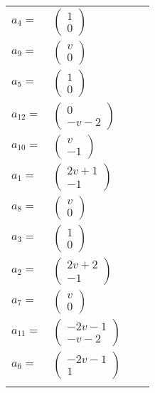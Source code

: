\documentclass[1p]{elsarticle_modified}
\theoremstyle{definition}
\begin{document}
\begin{tabular}{m{7pt} m{180pt} m{7pt} m{180pt} }
\flushright $a_{4}=$&$\begin{pmatrix}1\\0\end{pmatrix}$ \\
\flushright $a_{9}=$&$\begin{pmatrix}v\\0\end{pmatrix}$ \\
\flushright $a_{5}=$&$\begin{pmatrix}1\\0\end{pmatrix}$ \\
\flushright $a_{12}=$&$\begin{pmatrix}0\\- v-2\end{pmatrix}$ \\
\flushright $a_{10}=$&$\begin{pmatrix}v\\-1\end{pmatrix}$ \\
\flushright $a_{1}=$&$\begin{pmatrix}2 v+1\\-1\end{pmatrix}$ \\
\flushright $a_{8}=$&$\begin{pmatrix}v\\0\end{pmatrix}$ \\
\flushright $a_{3}=$&$\begin{pmatrix}1\\0\end{pmatrix}$ \\
\flushright $a_{2}=$&$\begin{pmatrix}2 v+2\\-1\end{pmatrix}$ \\
\flushright $a_{7}=$&$\begin{pmatrix}v\\0\end{pmatrix}$ \\
\flushright $a_{11}=$&$\begin{pmatrix}-2 v-1\\- v-2\end{pmatrix}$ \\
\flushright $a_{6}=$&$\begin{pmatrix}-2 v-1\\1\end{pmatrix}$\\&\end{tabular}
\end{document}
